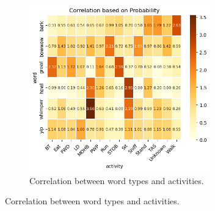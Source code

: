 \begin{figure}[h]
\begin{subfigure}[]{0.4\textwidth}
	\includegraphics[width=0.86\textwidth]{images/sound_activity_prior.png}
	\caption{Correlation between word types and activities.}
	\label{fig:sound_activity}
\end{subfigure}


\end{figure}

